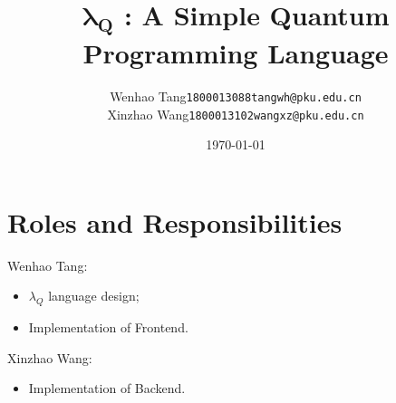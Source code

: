 \documentclass[11pt]{article}
\title{$\bm{\lambda_Q}$ : A Simple Quantum Programming Language}
\author{
  Wenhao Tang\quad \texttt{1800013088}\quad \texttt{tangwh@pku.edu.cn}
  \\[1ex]
  Xinzhao Wang\quad \texttt{1800013102}\quad \texttt{wangxz@pku.edu.cn}
}
\affil{Department of EECS\\ Peking University}
\date{\today}
\newcommand{\mycomment}[2]{{\small\color{magenta}\underline{\sf{#1}}:} {\color{magenta}{\small #2}}}
\begin{document}
\maketitle
\tableofcontents














\section{Roles and Responsibilities}
Wenhao Tang:
\begin{itemize}
  \item $\lambda_Q$ language design;
  \item Implementation of Frontend.
\end{itemize}

\noindent Xinzhao Wang:
\begin{itemize}
  \item Implementation of Backend.
\end{itemize}

\medskip


\end{document}
